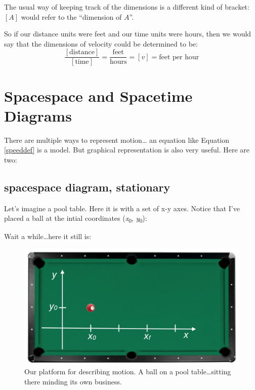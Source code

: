 \documentclass[
  letterpaper,
  DIV=11,
  numbers=noendperiod,
  oneside]{scrreprt}
\begin{document}
The usual way of keeping track of the dimensions is a different kind of
bracket: \([A]\) would refer to the ``dimension of \(A\)''.

So if our distance units were feet and our time units were hours, then
we would say that the dimensions of velocity could be determined to be:
\[
\dfrac{[\text{distance}]}{[\text{time}]}=\dfrac{\text{feet}}{\text{hours}} = [v] = \text{feet per hour}
\]

\section{Spacespace and Spacetime Diagrams}\label{sec-spacetimediagrams}

There are multiple ways to represent motion\ldots{} an equation like
Equation \ref{speeddef} is a model. But graphical representation is also
very useful. Here are two:

\subsection{spacespace diagram,
stationary}\label{spacespace-diagram-stationary}

Let's imagine a pool table. Here it is with a set of x-y axes. Notice
that I've placed a ball at the intial coordinates
(\emph{x}\textsubscript{0}, \emph{y}\textsubscript{0}):

Wait a while\ldots here it still is:

\begin{figure}[H]

{\centering \includegraphics[width=0.8\linewidth,height=\textheight,keepaspectratio]{mechanics/motion/screenshot_3649.png}

}

\caption{Our platform for describing motion. A ball on a pool
table\ldots sitting there minding its own business.}

\end{figure}%
\end{document}
